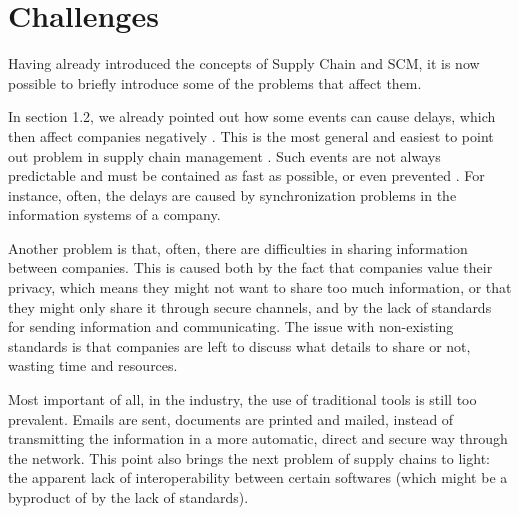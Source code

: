 \section{Challenges}

 Having already introduced the concepts of Supply Chain and SCM, it is now possible to briefly introduce some of the problems that affect them.


    In section 1.2, we already pointed out how some events can cause delays, which then affect companies negatively . This is the most general and easiest to point out problem in supply chain management . Such events are not always predictable and must be contained as fast as possible, or even prevented . For instance, often, the delays are caused by synchronization problems in the information systems of a company.
    
    Another problem is that, often, there are difficulties in sharing information between companies. This is caused both by the fact that companies value their privacy, which means they might not want to share too much information, or that they might only share it through secure channels, and by the lack of standards for sending information and communicating. The issue with non-existing standards is that companies are left to discuss what details to share or not, wasting time and resources.
    

Most important of all, in the industry, the use of traditional tools is still too prevalent. Emails are sent, documents are printed and mailed, instead of transmitting the information in a more automatic, direct and secure way through the network. This point also brings the next problem of supply chains to light: the apparent lack of interoperability between certain softwares (which might be a byproduct of by the lack of standards).
 
 
